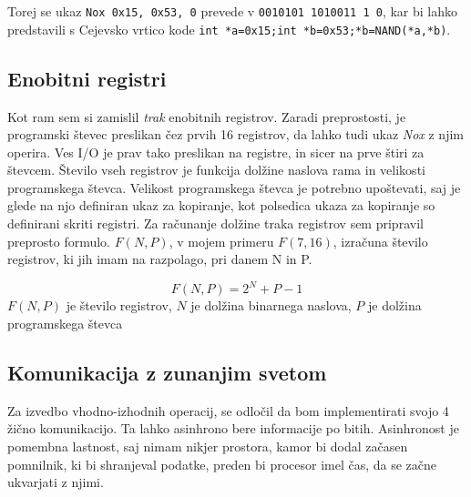 \documentclass[12pt]{article}
\begin{document}
Torej se ukaz \verb|Nox 0x15, 0x53, 0| prevede v \verb|0010101 1010011 1 0|, kar bi lahko predstavili s Cejevsko vrtico kode \verb|int *a=0x15;int *b=0x53;*b=NAND(*a,*b)|.

\subsection{Enobitni registri}
Kot ram sem si zamislil \textit{trak} enobitnih registrov.
Zaradi preprostosti, je programski števec preslikan čez prvih 16 registrov, da lahko tudi ukaz \textit{Nox} z njim operira.
Ves I/O je prav tako preslikan na registre, in sicer na prve štiri za števcem.
Število vseh registrov je funkcija dolžine naslova rama in velikosti programskega števca.
Velikost programskega števca je potrebno upoštevati, saj je glede na njo definiran ukaz za kopiranje, kot polsedica ukaza za kopiranje so definirani skriti registri.
Za računanje dolžine traka registrov sem pripravil preprosto formulo.
$F(N,P)$, v mojem primeru $F(7,16)$, izračuna število registrov, ki jih imam na razpolago, pri danem N in P.
\begin{center}
  \begin{displaymath}
    F(N,P)=2^{N}+P-1
  \end{displaymath}
  $F(N,P)$ je število registrov, $N$ je dolžina binarnega naslova, $P$ je dolžina programskega števca
\end{center}

\subsection{Komunikacija z zunanjim svetom}
Za izvedbo vhodno-izhodnih operacij, se odločil da bom implementirati svojo 4 žično komunikacijo.
Ta lahko asinhrono bere informacije po bitih.
Asinhronost je pomembna lastnost, saj nimam nikjer prostora, kamor bi dodal začasen pomnilnik, ki bi shranjeval podatke, preden bi procesor imel čas, da se začne ukvarjati z njimi.
\end{document}
